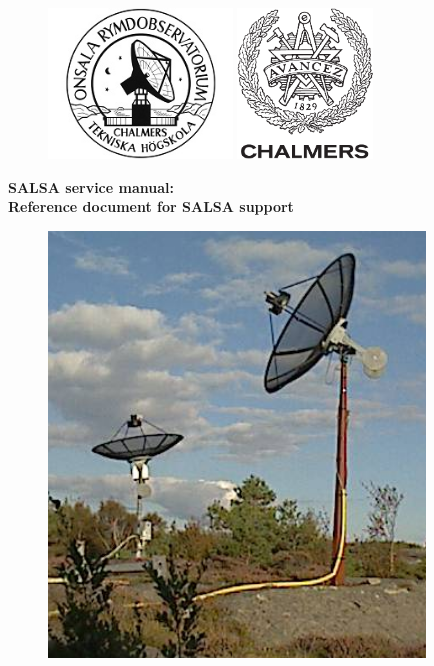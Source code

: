\begin{titlepage}

\begin{figure}[t]
\vspace{-2cm}
\centering
\includegraphics[height=4cm]{../figures/OSO-logo.jpg}
\hspace{4cm}
\includegraphics[height=4cm]{../figures/CHALMERS-logo.pdf}
\vspace{1cm}
\end{figure}

\begin{center}
{\bf
{\Huge SALSA service manual:}\\
\bigskip
{\Huge Reference document for SALSA support}
}
\end{center}

\begin{figure}[!h]
\centering
\includegraphics[width=10cm]{../figures/SALSA.png}
\end{figure}



\end{titlepage}
